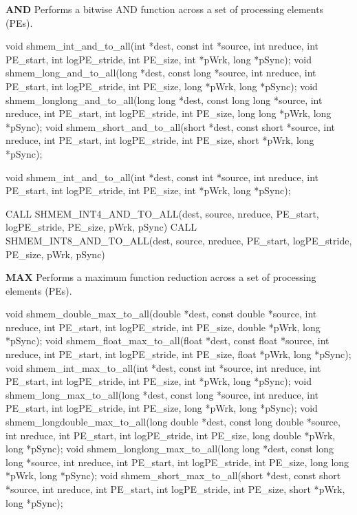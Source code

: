 
\begin{apidefinition}

\textbf{AND} \newline
Performs a bitwise AND function across a set of processing elements (\ac{PE}s).\newline
\begin{Csynopsis}
void shmem_int_and_to_all(int *dest, const int *source, int nreduce, int PE_start, int logPE_stride, int PE_size, int *pWrk, long *pSync);
void shmem_long_and_to_all(long *dest, const long *source, int nreduce, int PE_start, int logPE_stride, int PE_size, long *pWrk, long *pSync);
void shmem_longlong_and_to_all(long long *dest, const long long *source, int nreduce, int PE_start, int logPE_stride, int PE_size, long long *pWrk, long *pSync);
void shmem_short_and_to_all(short *dest, const short *source, int nreduce, int PE_start, int logPE_stride, int PE_size, short *pWrk, long *pSync);
\end{Csynopsis}

\begin{CsynopsisST}
void shmem_int_and_to_all(int *dest, const int *source, int nreduce, int PE_start, int logPE_stride, int PE_size, int *pWrk, long *pSync);
\end{CsynopsisST}

\begin{Fsynopsis}
CALL SHMEM_INT4_AND_TO_ALL(dest, source, nreduce, PE_start, logPE_stride, PE_size, pWrk, pSync)
CALL SHMEM_INT8_AND_TO_ALL(dest, source, nreduce, PE_start, logPE_stride, PE_size, pWrk, pSync)
\end{Fsynopsis}

\bigskip
\textbf{MAX} \newline
Performs a maximum function reduction across a set of processing elements (\ac{PE}s).\newline
\begin{Csynopsis}
void shmem_double_max_to_all(double *dest, const double *source, int nreduce, int PE_start, int logPE_stride, int PE_size, double *pWrk, long *pSync);
void shmem_float_max_to_all(float *dest, const float *source, int nreduce, int PE_start, int logPE_stride, int PE_size, float *pWrk, long *pSync);
void shmem_int_max_to_all(int *dest, const int *source, int nreduce, int PE_start, int logPE_stride, int PE_size, int *pWrk, long *pSync);
void shmem_long_max_to_all(long *dest, const long *source, int nreduce, int PE_start, int logPE_stride, int PE_size, long *pWrk, long *pSync);
void shmem_longdouble_max_to_all(long double *dest, const long double *source, int nreduce, int PE_start, int logPE_stride, int PE_size, long double *pWrk, long *pSync);
void shmem_longlong_max_to_all(long long *dest, const long long *source, int nreduce, int PE_start, int logPE_stride, int PE_size, long long *pWrk, long *pSync);
void shmem_short_max_to_all(short *dest, const short *source, int nreduce, int PE_start, int logPE_stride, int PE_size, short *pWrk, long *pSync);
\end{Csynopsis}


\end{apidefinition}
